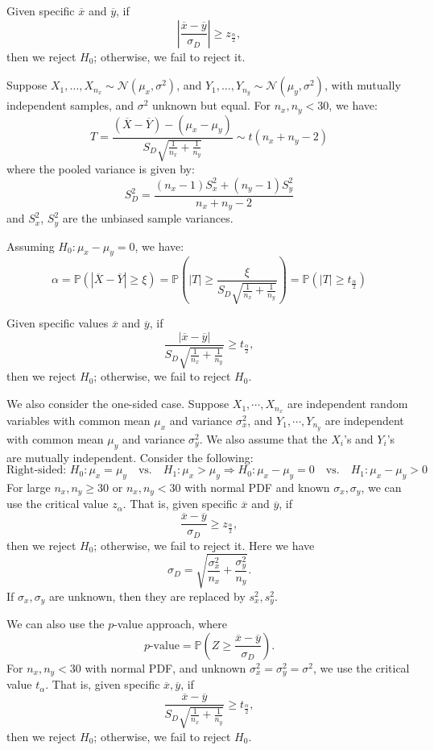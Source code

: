 Given specific \(\overline{x}\) and \(\overline{y}\), if
\[
  \left| \frac{\overline{x} - \overline{y}}{\sigma_D} \right| \geq z_{\frac{\alpha}{2}},
\]
then we reject \(H_0\); otherwise, we fail to reject it.

Suppose \(X_1, \dots, X_{n_x} \sim \mathcal{N}(\mu_x, \sigma^2)\), and \(Y_1, \dots, Y_{n_y} \sim \mathcal{N}(\mu_y, \sigma^2)\), with mutually independent samples, and \(\sigma^2\) unknown but equal. For \(n_x, n_y < 30\), we have:
\[
  T = \frac{(\overline{X} - \overline{Y}) - (\mu_x - \mu_y)}{S_D \sqrt{ \frac{1}{n_x} + \frac{1}{n_y} }} \sim t(n_x + n_y - 2)
\]
where the pooled variance is given by:
\[
  S_D^2 = \frac{(n_x - 1) S_x^2 + (n_y - 1) S_y^2}{n_x + n_y - 2}
\]
and \(S_x^2\), \(S_y^2\) are the unbiased sample variances.

Assuming \(H_0: \mu_x - \mu_y = 0\), we have:
\[
  \alpha = \mathbb{P} \left( \left| \overline{X} - \overline{Y} \right| \geq \xi \right)
  = \mathbb{P} \left( |T| \geq \frac{\xi}{S_D \sqrt{ \frac{1}{n_x} + \frac{1}{n_y} }} \right)
  = \mathbb{P} \left( |T| \geq t_{\frac{\alpha}{2}} \right)
\]

Given specific values \(\overline{x}\) and \(\overline{y}\), if
\[
  \frac{|\overline{x} - \overline{y}|}{S_D \sqrt{ \frac{1}{n_x} + \frac{1}{n_y} }} \geq t_{\frac{\alpha}{2}},
\]
then we reject \(H_0\); otherwise, we fail to reject \(H_0\).

We also consider the one-sided case. Suppose \(X_1, \cdots, X_{n_x}\) are independent random variables with common mean \(\mu_x\) and variance \(\sigma_x^2\), and \(Y_1, \cdots, Y_{n_y}\) are independent with common mean \(\mu_y\) and variance \(\sigma_y^2\). We also assume that the \(X_i\)'s and \(Y_i\)'s are mutually independent. Consider the following:
\[
  \text{Right-sided: } H_0: \mu_x = \mu_y \quad \text{vs.} \quad H_1: \mu_x > \mu_y \Longrightarrow H_0: \mu_x - \mu_y = 0 \quad \text{vs.} \quad H_1: \mu_x - \mu_y > 0
\]
For large \(n_x, n_y \geq 30\) or \(n_x, n_y < 30\) with normal PDF and known \(\sigma_x, \sigma_y\), we can use the critical value \(z_\alpha\). That is, given specific \(\overline{x}\) and \(\overline{y}\), if 
\[
  \frac{\overline{x} - \overline{y}}{\sigma_D} \geq z_{\frac{\alpha}{2}},
\]
then we reject \(H_0\); otherwise, we fail to reject it. Here we have 
\[
  \sigma_D = \sqrt{ \frac{\sigma_x^2}{n_x} + \frac{\sigma_y^2}{n_y} }.
\]
If \(\sigma_x, \sigma_y\) are unknown, then they are replaced by \(s_x^2, s_y^2\).

We can also use the \(p\)-value approach, where
\[
  p\text{-value} = \mathbb{P}\left( Z \geq \frac{\overline{x} - \overline{y}}{\sigma_D} \right).
\]
For \(n_x, n_y < 30\) with normal PDF, and unknown \(\sigma_x^2 = \sigma_y^2 = \sigma^2\), we use the critical value \(t_\alpha\). That is, given specific \(\overline{x}, \overline{y}\), if 
\[
  \frac{\overline{x} - \overline{y}}{S_D \sqrt{ \frac{1}{n_x} + \frac{1}{n_y} }} \geq t_{\frac{\alpha}{2}},
\]
then we reject \(H_0\); otherwise, we fail to reject \(H_0\).

